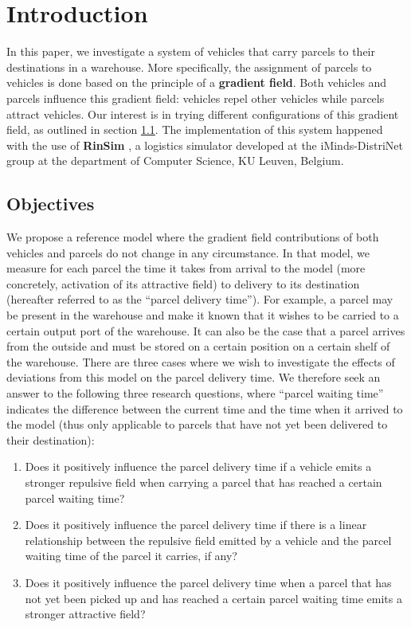 \section{Introduction}\label{sec:intro}
In this paper, we investigate a system of vehicles that carry parcels to their destinations in a warehouse. More specifically, the assignment of parcels to vehicles is done based on the principle of a \textbf{gradient field}. Both vehicles and parcels influence this gradient field: vehicles repel other vehicles while parcels attract vehicles. Our interest is in trying different configurations of this gradient field, as outlined in section \ref{sec:objectives}. The implementation of this system happened with the use of \textbf{RinSim} \cite{rinsim}, a logistics simulator developed at the iMinds-DistriNet group at the department of Computer Science, KU Leuven, Belgium.

\subsection{Objectives}\label{sec:objectives}
We propose a reference model where the gradient field contributions of both vehicles and parcels do not change in any circumstance. In that model, we measure for each parcel the time it takes from arrival to the model (more concretely, activation of its attractive field) to delivery to its destination (hereafter referred to as the ``parcel delivery time''). For example, a parcel may be present in the warehouse and make it known that it wishes to be carried to a certain output port of the warehouse. It can also be the case that a parcel arrives from the outside and must be stored on a certain position on a certain shelf of the warehouse.
There are three cases where we wish to investigate the effects of deviations from this model on the parcel delivery time. We therefore seek an answer to the following three research questions, where ``parcel waiting time'' indicates the difference between the current time and the time when it arrived to the model (thus only applicable to parcels that have not yet been delivered to their destination):

\begin{enumerate}
\item Does it positively influence the parcel delivery time if a vehicle emits a stronger repulsive field when carrying a parcel that has reached a certain parcel waiting time?
\item Does it positively influence the parcel delivery time if there is a linear relationship between the repulsive field emitted by a vehicle and the parcel waiting time of the parcel it carries, if any?
\item Does it positively influence the parcel delivery time when a parcel that has not yet been picked up and has reached a certain parcel waiting time emits a stronger attractive field?
\end{enumerate}

